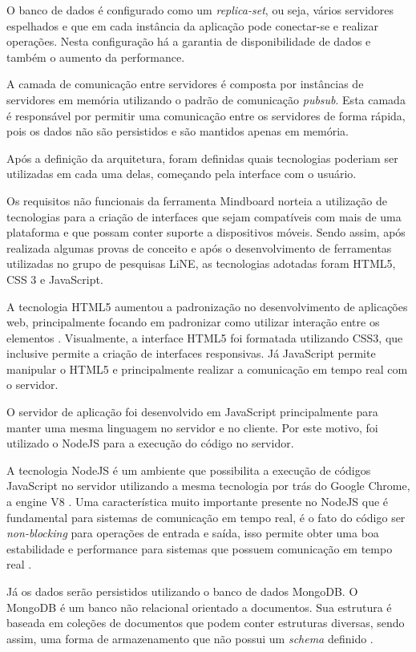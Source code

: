O banco de dados é configurado como um \emph{replica-set}, ou seja, vários servidores espelhados e que em cada instância da aplicação pode conectar-se e realizar operações. Nesta configuração há a garantia de disponibilidade de dados e também o aumento da performance.

A camada de comunicação entre servidores é composta por instâncias de servidores em memória utilizando o padrão de comunicação \emph{pubsub}. Esta camada é responsável por permitir uma comunicação entre os servidores de forma rápida, pois os dados não são persistidos e são mantidos apenas em memória.

Após a definição da arquitetura, foram definidas quais tecnologias poderiam ser utilizadas em cada uma delas, começando pela interface com o usuário. 

Os requisitos não funcionais da ferramenta Mindboard norteia a utilização de tecnologias para a criação de interfaces que sejam compatíveis com mais de uma plataforma e que possam conter suporte a dispositivos móveis. Sendo assim, após realizada algumas provas de conceito e após o desenvolvimento de ferramentas utilizadas no grupo de pesquisas LiNE, as tecnologias adotadas foram HTML5, CSS 3 e JavaScript.

A tecnologia HTML5 aumentou a padronização no desenvolvimento de aplicações web, principalmente focando em padronizar como utilizar interação entre os elementos \cite{html5}. Visualmente, a interface HTML5 foi formatada utilizando CSS3, que inclusive permite a criação de interfaces responsivas. Já JavaScript permite manipular o HTML5 e principalmente realizar a comunicação em tempo real com o servidor.

O servidor de aplicação foi desenvolvido em JavaScript principalmente para manter uma mesma linguagem no servidor e no cliente. Por este motivo, foi utilizado o NodeJS para a execução do código no servidor.

A tecnologia NodeJS é um ambiente que possibilita a execução de códigos JavaScript no servidor utilizando a mesma tecnologia por trás do Google Chrome, a engine V8 \cite{nodejs}. Uma característica muito importante presente no NodeJS que é fundamental para sistemas de comunicação em tempo real, é o fato do código ser \emph{non-blocking} para operações de entrada e saída, isso permite obter uma boa estabilidade e performance para sistemas que possuem comunicação em tempo real \cite{nodejs}.

Já os dados serão persistidos utilizando o banco de dados MongoDB. O MongoDB é um banco não relacional orientado a documentos. Sua estrutura é baseada em coleções de documentos que podem conter estruturas diversas, sendo assim, uma forma de armazenamento que não possui um \emph{schema} definido \cite{mongodb}. 

